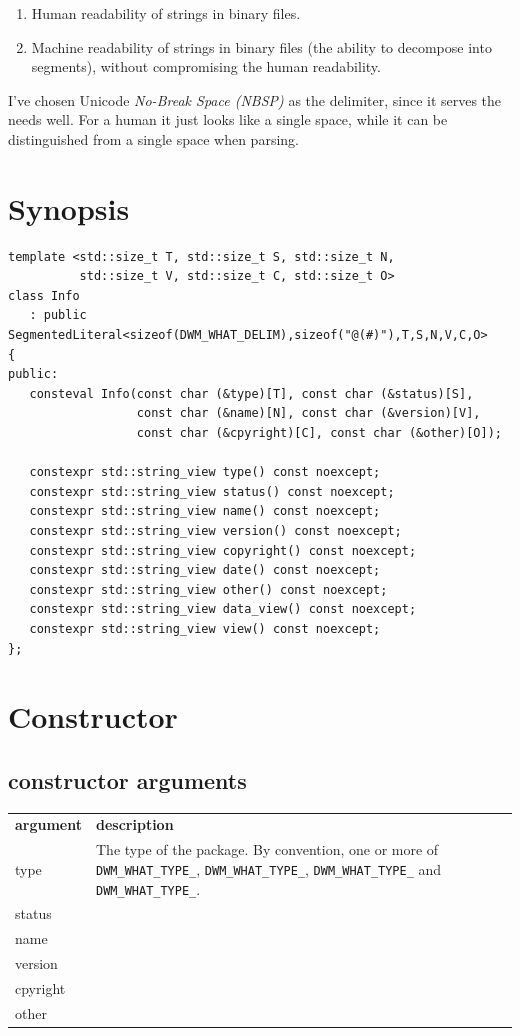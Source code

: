 \documentclass[letterpaper,openany]{book}
\begin{document}
\begin{enumerate}
\item Human readability of strings in binary files.
\item Machine readability of strings in binary files (the
ability to decompose into segments), without compromising the
human readability.
\end{enumerate}

I've chosen Unicode {\em No-Break Space (NBSP)} as the delimiter,
since it serves the needs well.  For a human it just looks like
a single space, while it can be distinguished from a single space
when parsing.

\section{Synopsis}

\begin{verbatim}
template <std::size_t T, std::size_t S, std::size_t N,
          std::size_t V, std::size_t C, std::size_t O>
class Info
   : public SegmentedLiteral<sizeof(DWM_WHAT_DELIM),sizeof("@(#)"),T,S,N,V,C,O>
{
public:
   consteval Info(const char (&type)[T], const char (&status)[S],
                  const char (&name)[N], const char (&version)[V],
                  const char (&cpyright)[C], const char (&other)[O]);

   constexpr std::string_view type() const noexcept;
   constexpr std::string_view status() const noexcept;
   constexpr std::string_view name() const noexcept;
   constexpr std::string_view version() const noexcept;
   constexpr std::string_view copyright() const noexcept;
   constexpr std::string_view date() const noexcept;
   constexpr std::string_view other() const noexcept;
   constexpr std::string_view data_view() const noexcept;
   constexpr std::string_view view() const noexcept;
};
\end{verbatim}

\section{Constructor}
\subsection{constructor arguments}
\begin{tabular}{ll}
\textbf{argument} & \textbf{description} \\
type & The type of the package.  By convention, one or more of
\texttt{DWM\_WHAT\_TYPE\_}, \texttt{DWM\_WHAT\_TYPE\_}, \texttt{DWM\_WHAT\_TYPE\_}
and \texttt{DWM\_WHAT\_TYPE\_}. \\
status & \\
name & \\
version & \\
cpyright & \\
other & \\
\end{tabular}
\end{document}
